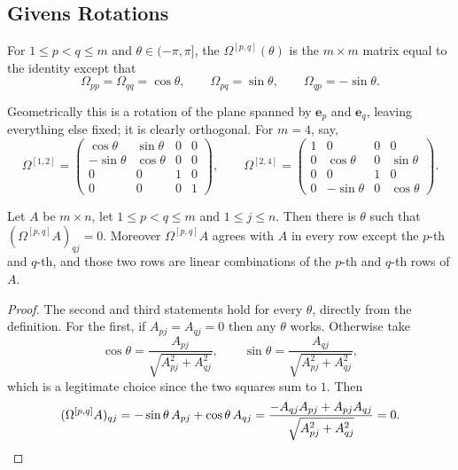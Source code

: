 \subsection{Givens Rotations}

\begin{definition}
  For $1 \leq p < q \leq m$ and $\theta \in (-\pi,\pi]$, the  $\Omega^{[p,q]}(\theta)$ is the $m\times m$ matrix equal to the identity except that
  $$
  \Omega_{pp} = \Omega_{qq} = \cos\theta, \qquad \Omega_{pq} = \sin\theta, \qquad \Omega_{qp} = -\sin\theta.
  $$
\end{definition}

Geometrically this is a rotation of the plane spanned by $\mathbf{e}_p$ and $\mathbf{e}_q$, leaving everything else fixed; it is clearly orthogonal. For $m = 4$, say,
$$
\Omega^{[1,2]} = \begin{pmatrix}\cos\theta & \sin\theta & 0&0\\ -\sin\theta&\cos\theta&0&0\\0&0&1&0\\0&0&0&1\end{pmatrix}, \qquad
\Omega^{[2,4]} = \begin{pmatrix}1&0&0&0\\0&\cos\theta&0&\sin\theta\\0&0&1&0\\0&-\sin\theta&0&\cos\theta\end{pmatrix}.
$$

\begin{proposition}\label{prop:givens}
  Let $A$ be $m\times n$, let $1 \leq p < q \leq m$ and $1\leq j \leq n$. Then there is $\theta$ such that $(\Omega^{[p,q]}A)_{qj} = 0$. Moreover $\Omega^{[p,q]}A$ agrees with $A$ in every row except the $p$-th and $q$-th, and those two rows are linear combinations of the $p$-th and $q$-th rows of $A$.
\end{proposition}
\begin{proof}
  The second and third statements hold for every $\theta$, directly from the definition. For the first, if $A_{pj} = A_{qj} = 0$ then any $\theta$ works. Otherwise take
  $$
  \cos\theta = \frac{A_{pj}}{\sqrt{A_{pj}^2 + A_{qj}^2}}, \qquad \sin\theta = \frac{A_{qj}}{\sqrt{A_{pj}^2 + A_{qj}^2}},
  $$
  which is a legitimate choice since the two squares sum to $1$. Then
  $$
  (\Omega^{[p,q]}A)_{qj} = -\sin\theta\, A_{pj} + \cos\theta\, A_{qj} = \frac{-A_{qj}A_{pj} + A_{pj}A_{qj}}{\sqrt{A_{pj}^2+A_{qj}^2}} = 0. \qedhere
  $$
\end{proof}

